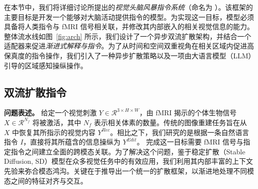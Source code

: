在本节中，我们将详细讨论所提出的\emph{视觉头脑风暴指令系统}（命名为 \textbf{\model{}}）。该框架的主要目标是开发一个能够对大脑活动提供指令的模型。为实现这一目标，模型必须具备将人类指令与 fMRI 信号相关联，并修改其内部嵌入的相关视觉信息的能力。整体流水线如图~\ref{fig:arch} 所示，我们设计了一个异步双流扩散架构，并结合一个适配器来促进\emph{渐进式解释与指令}。为了从时间和空间双重视角在相关区域内促进高保真度的指令操作，我们引入了一种异步扩散策略以及一项由大语言模型（LLM）引导的区域感知操纵操作。

\subsection{双流扩散指令}
\textbf{问题表述。} 给定一个视觉刺激 $Y \in \mathcal{R}^{3 \times H \times W}$，由 fMRI 揭示的个体生物信号 $X \in \mathcal{R}^{N_f}$ 将被激活，其中 ${N_f}$ 表示相关体素的数量。传统的图像重建任务旨在从 $X$ 中恢复其所指示的视觉内容 $Y^{Rec}$。相比之下，我们研究的是根据一条自然语言指令 $I$，直接将其所蕴含的信息操纵为 $Y^{Edit}$。
完成这一目标需要 fMRI 信号与指定指令之间建立全面的跨模态关联。为了解决这个问题，鉴于稳定扩散（Stable Diffusion, SD）模型在众多视觉任务中的有效应用，我们利用其内部丰富的上下文先验来弥合模态鸿沟。关键在于推导出一个统一的扩散框架，以渐进地处理不同模态之间的特征对齐与交互。

